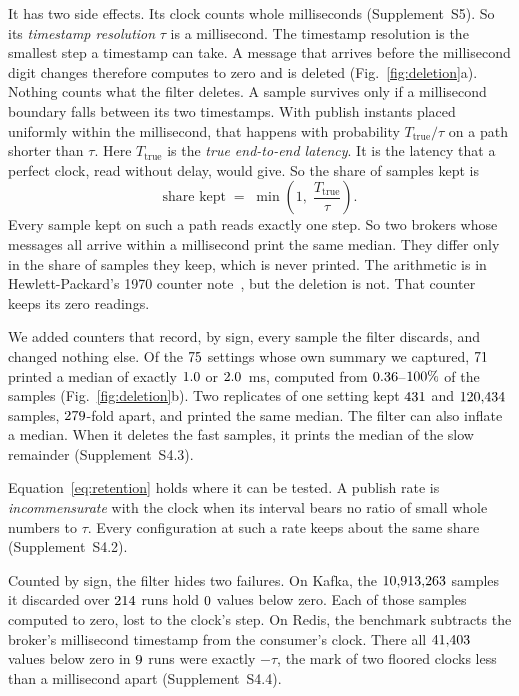 \documentclass[10pt,journal,compsoc]{IEEEtran}
\newcommand{\kafka}{Kafka}
\newcommand{\redis}{Redis}
\begin{document}
It has two side effects. Its clock counts whole milliseconds (Supplement~S5). So its \emph{timestamp resolution}
$\tau$ is a millisecond. The timestamp resolution is the smallest step a timestamp can take. A
message that arrives before
the millisecond digit changes therefore computes to zero and is deleted (Fig.~\ref{fig:deletion}a).
Nothing counts what the filter deletes. A sample survives only if a millisecond boundary falls between its two timestamps. With publish instants placed uniformly within the millisecond, that happens with
probability $T_{\mathrm{true}}/\tau$ on a path shorter than $\tau$. Here
$T_{\mathrm{true}}$\label{def:ttrue} is the \emph{true end-to-end latency}. It is the latency that
a perfect clock, read without delay, would give. So the share of samples kept is
\begin{equation}
\label{eq:retention}
\text{share kept} \;=\; \min\!\left(1,\; \frac{T_{\mathrm{true}}}{\tau}\right) .
\end{equation}
Every sample kept on such a path reads exactly one step. So two brokers whose messages all
arrive within a millisecond print the same median. They differ only in the share of samples they
keep, which is never printed. The arithmetic is in Hewlett-Packard's 1970 counter note~\cite{hp1970tia}, but the
deletion is not. That counter keeps its zero readings.

We added counters that record, by sign, every sample the filter discards, and changed nothing
else.  Of the $75$ settings whose own summary we captured,
$71$ printed a median of exactly $1.0$ or $2.0$~ms,
computed from $0.36$--$100\%$ of the samples
(Fig.~\ref{fig:deletion}b). Two
replicates of one setting kept $431$ and $120{,}434$ samples, $279$-fold
apart, and printed the same median. The filter can also inflate a median. When it deletes the fast samples, it prints the median
of the slow remainder (Supplement~S4.3).

Equation~\ref{eq:retention} holds where it can be tested. A publish rate is \emph{incommensurate} with the clock when its interval bears no ratio of small whole numbers to $\tau$. Every configuration at such a rate keeps about the same share (Supplement~S4.2).

Counted by sign, the filter hides two failures. On \kafka{}, the $10{,}913{,}263$ samples it
discarded over $214$ runs hold $0$ values below zero. Each of those
samples computed to zero, lost to the clock's step. On \redis{}, the benchmark subtracts the
broker's millisecond timestamp from the consumer's clock. There all $41{,}403$ values
below zero in $9$ runs were exactly $-\tau$, the mark of two floored clocks less than a
millisecond apart (Supplement~S4.4).
\end{document}
